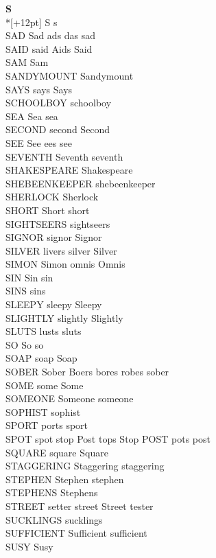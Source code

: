 \vspace{14pt}
\noindent\textbf{\Large S}\\*[+12pt]
S s\\
SAD Sad ads das sad\\
SAID said Aids Said\\
SAM Sam\\
SANDYMOUNT Sandymount\\
SAYS says Says\\
SCHOOLBOY schoolboy\\
SEA Sea sea\\
SECOND second Second\\
SEE See ees see\\
SEVENTH Seventh seventh\\
SHAKESPEARE Shakespeare\\
SHEBEENKEEPER shebeenkeeper\\
SHERLOCK Sherlock\\
SHORT Short short\\
SIGHTSEERS sightseers\\
SIGNOR signor Signor\\
SILVER livers silver Silver\\
SIMON Simon omnis Omnis\\
SIN Sin sin\\
SINS sins\\
SLEEPY sleepy Sleepy\\
SLIGHTLY slightly Slightly\\
SLUTS lusts sluts\\
SO So so\\
SOAP soap Soap\\
SOBER Sober Boers bores robes sober\\
SOME some Some\\
SOMEONE Someone someone\\
SOPHIST sophist\\
SPORT ports sport\\
SPOT spot stop Post tops Stop POST pots post\\
SQUARE square Square\\
STAGGERING Staggering staggering\\
STEPHEN Stephen stephen\\
STEPHENS Stephens\\
STREET setter street Street tester\\
SUCKLINGS sucklings\\
SUFFICIENT Sufficient sufficient\\
SUSY Susy\\
